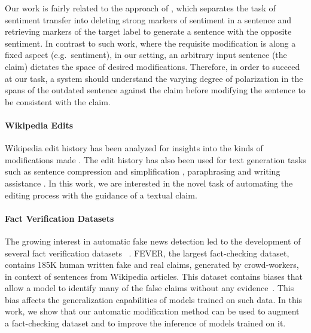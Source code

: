 \documentclass[letterpaper]{article} %
\begin{document}
Our work is fairly related to the approach of \cite{li-etal-2018-delete}, which separates the task of sentiment transfer into deleting strong markers of sentiment in a sentence and retrieving markers of the target label to generate a sentence with the opposite sentiment. In contrast to such work, where the requisite modification is along a fixed aspect (e.g.\ sentiment), in our setting, an arbitrary input sentence (the claim) dictates the space of desired modifications. Therefore, in order to succeed at our task, a system should understand the varying degree of polarization in the spans of the outdated sentence against the claim before modifying the sentence to be consistent with the claim.%

\paragraph{Wikipedia Edits}
Wikipedia edit history has been analyzed for insights into the kinds of modifications made
\cite{daxenberger-gurevych-2013-automatically,yang-etal-2017-identifying-semantic,faruqui-etal-2018-wikiatomicedits}. The edit history has also been used for text generation tasks such as sentence compression and simplification
\cite{yatskar-etal-2010-sake}, paraphrasing \cite{max-wisniewski-2010-mining} and writing assistance 
\cite{cahill-etal-2013-robust}. In this work, we are interested in the novel task of automating the editing process with the guidance of a textual claim.

\paragraph{Fact Verification Datasets}

The growing interest in automatic fake news detection led to the development of several fact verification datasets 
~\cite{vlachos-riedel-2014-fact,wang-2017-liar,rashkin-etal-2017-truth,fever}. FEVER, the largest fact-checking dataset, contains 185K human written fake and real claims, generated by crowd-workers, in context of sentences from Wikipedia articles. 
This dataset contains biases that allow a model to identify many of the false claims without any evidence~\cite{schuster2019towards}. 
This bias affects the generalization capabilities of models trained on such data. 
In this work, we show that our automatic modification method can be used to augment a fact-checking dataset and to improve the inference of models trained on it.
\end{document}
